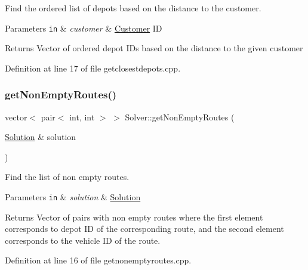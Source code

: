 Find the ordered list of depots based on the distance to the customer. 


\begin{DoxyParams}[1]{Parameters}
\mbox{\tt in}  & {\em customer} & \hyperlink{class_customer}{Customer} ID\\
\hline
\end{DoxyParams}
\begin{DoxyReturn}{Returns}
Vector of ordered depot I\+Ds based on the distance to the given customer 
\end{DoxyReturn}


Definition at line 17 of file getclosestdepots.\+cpp.

\mbox{\label{class_solver_a766b8061001fee9f4f9e86440aa5f307}} 
\subsubsection{\texorpdfstring{get\+Non\+Empty\+Routes()}{getNonEmptyRoutes()}}
{\footnotesize\ttfamily vector$<$ pair$<$ int, int $>$ $>$ Solver\+::get\+Non\+Empty\+Routes (\begin{DoxyParamCaption}\item[{\hyperlink{class_solution}{Solution} \&}]{solution }\end{DoxyParamCaption})\hspace{0.3cm}{\ttfamily [private]}}



Find the list of non empty routes. 


\begin{DoxyParams}[1]{Parameters}
\mbox{\tt in}  & {\em solution} & \hyperlink{class_solution}{Solution}\\
\hline
\end{DoxyParams}
\begin{DoxyReturn}{Returns}
Vector of pairs with non empty routes where the first element corresponds to depot ID of the corresponding route, and the second element corresponds to the vehicle ID of the route. 
\end{DoxyReturn}


Definition at line 16 of file getnonemptyroutes.\+cpp.

\mbox{\label{class_solver_ad57e0ae1fd285942fc7cc5a38fac1a07}} 
